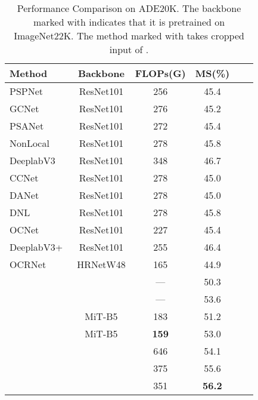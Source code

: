 \documentclass[10pt,twocolumn,letterpaper]{article}
\begin{document}
\begin{table}
\small
  \centering
  \renewcommand\arraystretch{1.15}
  
  \begin{tabular}{lccccc} \hline 
  
  \hline
  \small{Method} & Backbone & FLOPs(G) & MS(\%) \\
\hline
  PSPNet~\cite{zhao2017pyramid}  & ResNet101 & 256 & 45.4\\
   GCNet~\cite{cao2019gcnet}  & ResNet101 & 276  & 45.2 \\
   PSANet~\cite{zhao2018psanet}  & ResNet101 & 272 & 45.4 \\
   NonLocal~\cite{wang2018non}  & ResNet101 & 278 & 45.8 \\
   DeeplabV3~\cite{chen2017rethinking} &ResNet101 & 348 & 46.7 \\
   CCNet~\cite{huang2019ccnet}  & ResNet101 & 278 & 45.0 \\
   DANet~\cite{fu2019dual}  & ResNet101 & 278 & 45.0 \\
   DNL~\cite{yin2020disentangled}  & ResNet101 & 278 & 45.8 \\
   OCNet~\cite{yuan2018ocnet}  & ResNet101 & 227 & 45.4 \\
   DeeplabV3+~\cite{chen2018encoder}  & ResNet101 & 255 &46.4 \\
   OCRNet~\cite{yuan2020object} & HRNetW48 & 165& 44.9\\
   \hline
   \text{~\cite{zheng2021rethinking}}  & & --- & 50.3 \\
   \text{~\cite{strudel2021segmenter}}  &  & --- & 53.6\\
   \text{~\cite{xie2021segformer}}   & MiT-B5 & 183 & 51.2\\
      & MiT-B5 & \textbf{159} & 53.0 \\
   \text{~\cite{liu2021swin}} &  & 646 & 54.1 \\ 
   \text{~\cite{cheng2021maskformer}}  &  & 375 & 55.6 \\
      &  & 351 & \textbf{56.2}\\
  \hline
  
  
  \hline
  
  \end{tabular}
  \caption{Performance Comparison on ADE20K. The backbone marked with  indicates that it is pretrained on ImageNet22K. The method marked with  takes cropped input of .}
  \label{tab:ade20k}
\end{table}
\end{document}
